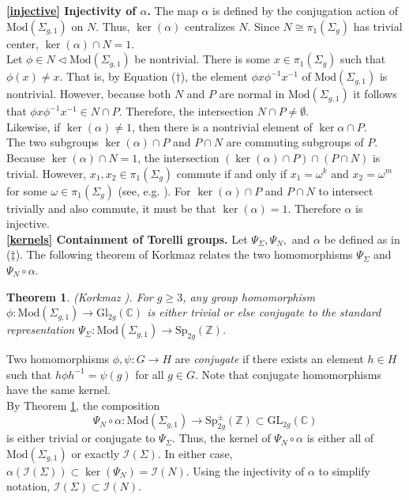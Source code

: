 \documentclass[a4paper]{amsproc}
\theoremstyle{TheoremNum}
\theoremstyle{Theorembold}
\newtheorem{thm}{Theorem}[section]
\theoremstyle{TheoremboldDef}
\theoremstyle{TheoremboldRem}
\theoremstyle{TheoremboldRem}
\begin{document}
\textbf{\ref{injective} Injectivity of ${\alpha}$.}
The map ${\alpha}$ is defined by the conjugation action of ${\text{Mod}(\Sigma_{g,1})}$ on $N$. Thus, $\ker({\alpha})$ centralizes $N$. Since $N\cong \pi_1(\Sigma_g)$ has trivial center, $\ker({\alpha})\cap N=1$.\\ 

Let $\phi\in N\triangleleft{\text{Mod}(\Sigma_{g,1})}$ be nontrivial. There is some $x\in {\pi_1(\Sigma_g)}$ such that $\phi(x)\neq x$. That is, by Equation ($\dagger$), the element $\phi x\phi^{-1}x^{-1}$ of ${\text{Mod}(\Sigma_{g,1})}$ is nontrivial. However, because both $N$ and $P$ are normal in ${\text{Mod}(\Sigma_{g,1})}$ it follows that $\phi x\phi^{-1}x^{-1}\in N \cap P$. Therefore, the intersection $N\cap P\not=\emptyset$.\\

Likewise, if $\ker({\alpha})\not=1$, then there is a nontrivial element of $\ker{\alpha}\cap P$.\\

The two subgroups $\ker{({\alpha})}\cap P$ and $P\cap N$ are commuting subgroups of $P$. Because $\ker({\alpha})\cap N=1$, the intersection $(\ker{({\alpha})}\cap P)\cap (P\cap N)$ is trivial. However, $x_1,x_2\in {\pi_1(\Sigma_g)}$ commute if and only if $x_1=\omega^k$ and $x_2=\omega^m$ for some $\omega\in{\pi_1(\Sigma_g)}$ (see, e.g. \cite[Sect.1.1.3]{primer}). For $\ker{({\alpha})}\cap P$ and $P\cap N$ to intersect trivially and also commute, it must be that $\ker{({\alpha})}=1$. Therefore ${\alpha}$ is injective.\\

\textbf{\ref{kernels} Containment of Torelli groups.} Let $\Psi_\Sigma, \Psi_N,$ and ${\alpha}$ be defined as in ($\ddagger$). The following theorem of Korkmaz relates the two homomorphisms $\Psi_\Sigma$ and $\Psi_N\circ{\alpha}$.
\begin{thm}\label{kor}(Korkmaz \cite[Thm.1]{korkmaz}). For $g{\geqslant} 3$, any group homomorphism $\phi:{\text{Mod}(\Sigma_{g,1})}\to \text{Gl}_{2g}({\mathbb{C}})$ is either trivial or else conjugate to the standard representation $\Psi_\Sigma:{\text{Mod}(\Sigma_{g,1})}\to{\text{Sp}_{2g}({\mathbb{Z}})}$.
\end{thm}
 Two homomorphisms $\phi,\psi:G\to H$ are \emph{conjugate} if there exists an element $h\in H$ such that $h\phi h^{-1}=\psi(g)$ for all $g\in G$. Note that conjugate homomorphisms have the same kernel.\\

By Theorem \ref{kor}, the composition \[\Psi_N\circ{\alpha}:{\text{Mod}(\Sigma_{g,1})}\to {\text{Sp}_{2g}^{\pm}({\mathbb{Z}})}\subset \text{GL}_{2g}({\mathbb{C}})\] is either trivial or conjugate to $\Psi_\Sigma$. Thus, the kernel of $\Psi_N\circ{\alpha}$ is either all of ${\text{Mod}(\Sigma_{g,1})}$ or exactly ${{\mathcal{I}}(\Sigma)}$. In either case, ${\alpha}({{\mathcal{I}}(\Sigma)})\subset\ker(\Psi_N)={{\mathcal{I}}(N)}$. Using the injectivity of ${\alpha}$ to simplify notation, ${{\mathcal{I}}(\Sigma)}\subset{{\mathcal{I}}(N)}$.\\
\end{document}
